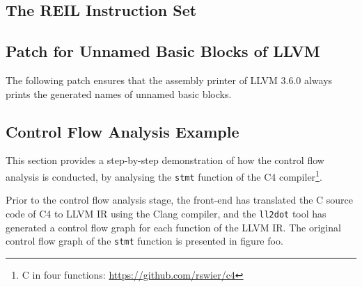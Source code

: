
\pagebreak


\subsection{The REIL Instruction Set}
\label{app:reil_instructions}



\pagebreak


\subsection{Patch for Unnamed Basic Blocks of LLVM}
\label{app:unnamed_patch}

The following patch ensures that the assembly printer of LLVM 3.6.0 always prints the generated names of unnamed basic blocks.



\pagebreak


\subsection{Control Flow Analysis Example}
\label{app:control_flow_analysis_example}


This section provides a step-by-step demonstration of how the control flow analysis is conducted, by analysing the \texttt{stmt} function of the C4 compiler\footnote{C in four functions: \url{https://github.com/rswier/c4}}.

Prior to the control flow analysis stage, the front-end has translated the C source code of C4 to LLVM IR using the Clang compiler, and the \texttt{ll2dot} tool has generated a control flow graph for each function of the LLVM IR. The original control flow graph of the \texttt{stmt} function is presented in figure foo. %

